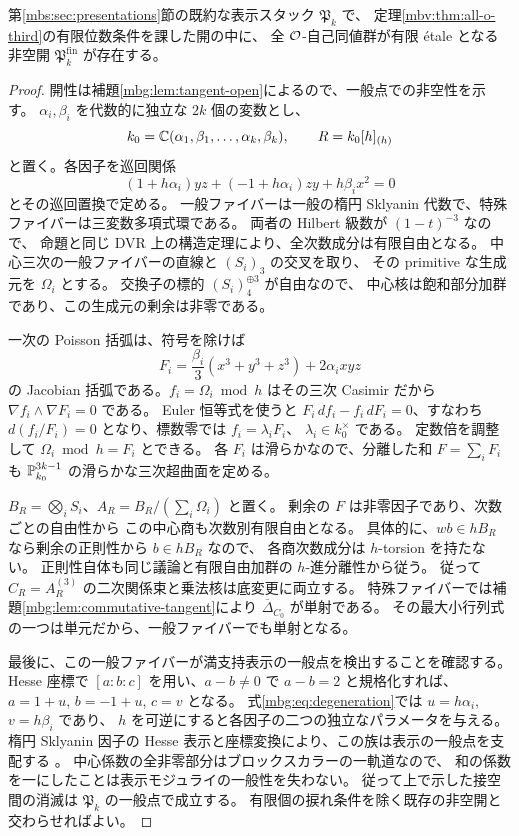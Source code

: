 \begin{proposition}[満支持一般点での有限自己同値]
\label{mbg:prop:finite-open}
第\ref{mbs:sec:presentations}節の既約な表示スタック $\mathfrak P_k$ で、
定理\ref{mbv:thm:all-o-third}の有限位数条件を課した開の中に、
全 $\mathcal O$-自己同値群が有限 \'etale となる非空開 $\mathfrak P_k^{\mathrm{fin}}$ が存在する。
\end{proposition}
\begin{proof}
開性は補題\ref{mbg:lem:tangent-open}によるので、一般点での非空性を示す。
$\alpha_i,\beta_i$ を代数的に独立な $2k$ 個の変数とし、
\[
 k_0=\mathbb C(\alpha_1,\beta_1,\ldots,\alpha_k,\beta_k),\qquad
 R=k_0[h]_{(h)}
\]
と置く。各因子を巡回関係
\begin{equation}\label{mbg:eq:degeneration}
 (1+h\alpha_i)yz+(-1+h\alpha_i)zy+h\beta_i x^2=0
\end{equation}
とその巡回置換で定める。
一般ファイバーは一般の楕円 Sklyanin 代数で、特殊ファイバーは三変数多項式環である。
両者の Hilbert 級数が $(1-t)^{-3}$ なので、
命題と同じ DVR 上の構造定理により、全次数成分は有限自由となる。
中心三次の一般ファイバーの直線と $(S_i)_3$ の交叉を取り、
その primitive な生成元を $\Omega_i$ とする。
交換子の標的 $(S_i)_4^{\oplus3}$ が自由なので、
中心核は飽和部分加群であり、この生成元の剰余は非零である。

一次の Poisson 括弧は、符号を除けば
\[
 F_i=\frac{\beta_i}{3}(x^3+y^3+z^3)+2\alpha_i xyz
\]
の Jacobian 括弧である。$f_i=\Omega_i\bmod h$ はその三次 Casimir だから
$\nabla f_i\wedge\nabla F_i=0$ である。
Euler 恒等式を使うと $F_i\,df_i-f_i\,dF_i=0$、すなわち
$d(f_i/F_i)=0$ となり、標数零では $f_i=\lambda_iF_i$、
$\lambda_i\in k_0^\times$ である。
定数倍を調整して $\Omega_i\bmod h=F_i$ とできる。
各 $F_i$ は滑らかなので、分離した和 $F=\sum_iF_i$ も
$\mathbb P^{3k-1}_{k_0}$ の滑らかな三次超曲面を定める。

$B_R=\bigotimes_iS_i$、$A_R=B_R/(\sum_i\Omega_i)$ と置く。
剰余の $F$ は非零因子であり、次数ごとの自由性から
この中心商も次数別有限自由となる。
具体的に、$w b\in hB_R$ なら剰余の正則性から $b\in hB_R$ なので、
各商次数成分は $h$-torsion を持たない。
正則性自体も同じ議論と有限自由加群の $h$-進分離性から従う。
従って $C_R=A_R^{(3)}$ の二次関係束と乗法核は底変更に両立する。
特殊ファイバーでは補題\ref{mbg:lem:commutative-tangent}により
$\overline\Delta_{C_0}$ が単射である。
その最大小行列式の一つは単元だから、一般ファイバーでも単射となる。

最後に、この一般ファイバーが満支持表示の一般点を検出することを確認する。
Hesse 座標で $[a:b:c]$ を用い、$a-b\ne0$ で $a-b=2$ と規格化すれば、
$a=1+u$, $b=-1+u$, $c=v$ となる。
式\eqref{mbg:eq:degeneration}では $u=h\alpha_i$, $v=h\beta_i$ であり、
$h$ を可逆にすると各因子の二つの独立なパラメータを与える。
楕円 Sklyanin 因子の Hesse 表示と座標変換により、この族は表示の一般点を支配する
\cite[\S1]{GRSklyaninST}。
中心係数の全非零部分はブロックスカラーの一軌道なので、
和の係数を一にしたことは表示モジュライの一般性を失わない。
従って上で示した接空間の消滅は $\mathfrak P_k$ の一般点で成立する。
有限個の捩れ条件を除く既存の非空開と交わらせればよい。
\end{proof}

